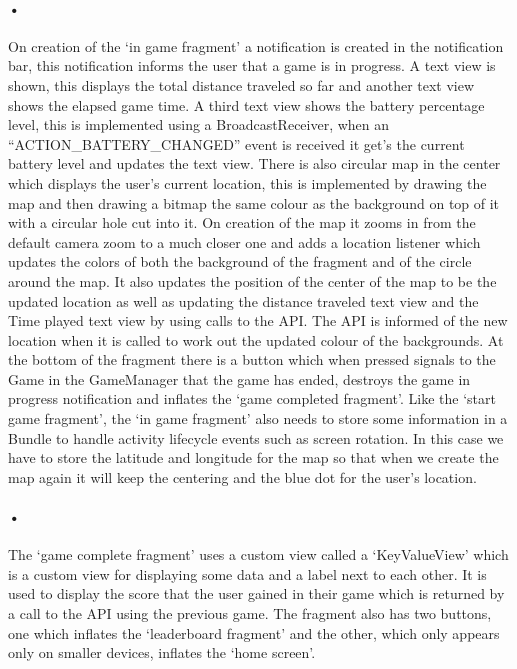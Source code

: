\documentclass[10pt, a4paper]{article}
\begin{document}
\paragraph*{•}
On creation of the `in game fragment' a notification is created in the notification bar, this notification informs the user that a game is in progress. A text view is shown, this displays the total distance traveled so far and another text view shows the elapsed game time. A third text view shows the battery percentage level, this is implemented using a BroadcastReceiver, when an ``ACTION\_BATTERY\_CHANGED'' event is received it get's the current battery level and updates the text view. There is also circular map in the center which displays the user's current location, this is implemented by drawing the map and then drawing a bitmap the same colour as the background on top of it with a circular hole cut into it. On creation of the map it zooms in from the default camera zoom to a much closer one and adds a location listener which updates the colors of both the background of the fragment and of the circle around the map. It also updates the position of the center of the map to be the updated location as well as updating the distance traveled text view and the Time played text view by using calls to the API. The API is informed of the new location when it is called to work out the updated colour of the backgrounds. At the bottom of the fragment there is a button which when pressed signals to the Game in the GameManager that the game has ended, destroys the game in progress notification and inflates the `game completed fragment'. Like the `start game fragment', the `in game fragment' also needs to store some information in a Bundle to handle activity lifecycle events such as screen rotation. In this case we have to store the latitude and longitude for the map so that when we create the map again it will keep the centering and the blue dot for the user's location.

\paragraph*{•}
The `game complete fragment' uses a custom view called a `KeyValueView' which is a custom view for displaying some data and a label next to each other. It is used to display the score that the user gained in their game which is returned by a call to the API using the previous game. The fragment also has two buttons, one which inflates the `leaderboard fragment' and the other, which only appears only on smaller devices, inflates the `home screen'.
\end{document}
